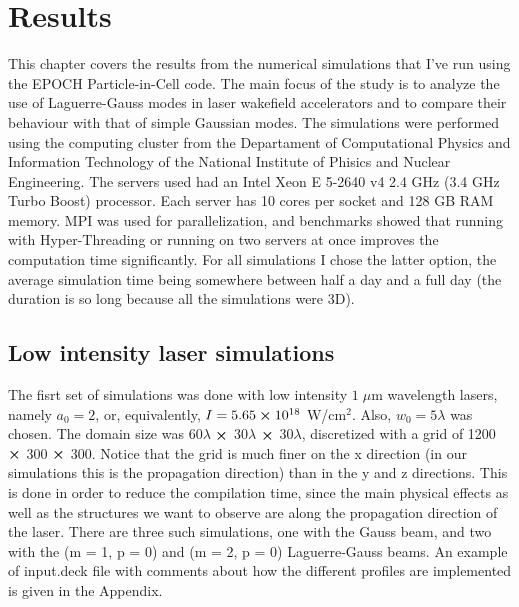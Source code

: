 \documentclass[12pt, class=report, crop=false]{standalone}
\begin{document}
\chapter{Results}%
\label{chap:results}

This chapter covers the results from the numerical simulations that I've run using the EPOCH Particle-in-Cell code. The main focus of the study is to analyze the use of Laguerre-Gauss modes in laser wakefield accelerators and to compare their behaviour with that of simple Gaussian modes. The simulations were performed using the computing cluster from the Departament of Computational Physics and Information Technology of the National Institute of Phisics and Nuclear Engineering. The servers used had an Intel\textsuperscript{\tiny\textregistered} Xeon\textsuperscript{\tiny\textregistered} E 5-2640 v4 2.4 GHz (3.4 GHz Turbo Boost) processor. Each server has 10 cores per socket and 128 GB RAM memory. MPI was used for parallelization, and benchmarks showed that running with Hyper-Threading or running on two servers at once improves the computation time significantly. For all simulations I chose the latter option, the average simulation time being somewhere between half a day and a full day (the duration is so long because all the simulations were 3D).

\section{Low intensity laser simulations}

The fisrt set of simulations was done with low intensity \(1\; \mu\)m wavelength lasers, namely \(a_0 = 2\), or, equivalently, \(I = 5.65 \cp 10^{18}\) W/cm$^2$. Also, \(w_0 = 5\lambda\) was chosen. The domain size was 60$\lambda$ $\cp$ 30$\lambda$ $\cp$ 30$\lambda$, discretized with a grid of 1200 $\cp$ 300 $\cp$ 300. Notice that the grid is much finer on the x direction (in our simulations this is the propagation direction) than in the y and z directions. This is done in order to reduce the compilation time, since the main physical effects as well as the structures we want to observe are along the propagation direction of the laser. There are three such simulations, one with the Gauss beam, and two with the (m = 1, p = 0) and (m = 2, p = 0) Laguerre-Gauss beams. An example of input.deck file with comments about how the different profiles are implemented is given in the Appendix.
\end{document}
